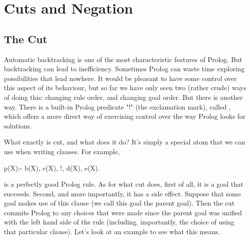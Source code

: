 

\chapter{Cuts and Negation}\label{CHAPTER10}


\section{The Cut}\label{SEC.L10.CUT}



Automatic backtracking is one of the most characteristic features of
Prolog.  But backtracking can lead to inefficiency.  Sometimes Prolog
can waste time exploring possibilities that lead nowhere.  It would be
pleasant to have some control over this aspect of its behaviour, but
so far we have only seen two (rather crude) ways of doing this:
changing rule order, and changing goal order.  But there is another
way.  There is a built-in Prolog predicate "!" (the exclamation mark), called
, which offers a more
direct way of exercising control over the way Prolog looks for
solutions.

What exactly is cut, and what does it do?  It's simply a special atom
that we can use when writing clauses.  For example,
\begin{LPNcodedisplay}
p(X):- b(X), c(X), !, d(X), e(X).
\end{LPNcodedisplay}
is a perfectly good Prolog rule.  As for what cut does, first of all,
it is a goal that  succeeds.  Second, and more importantly,
it has a side effect.  Suppose that some goal makes use of this clause
(we call this goal the parent goal).  Then the cut commits Prolog to
any choices that were made since the parent goal was unified with the
left hand side of the rule (including, importantly, the choice of
using that particular clause).  Let's look at an example to see what
this means.

